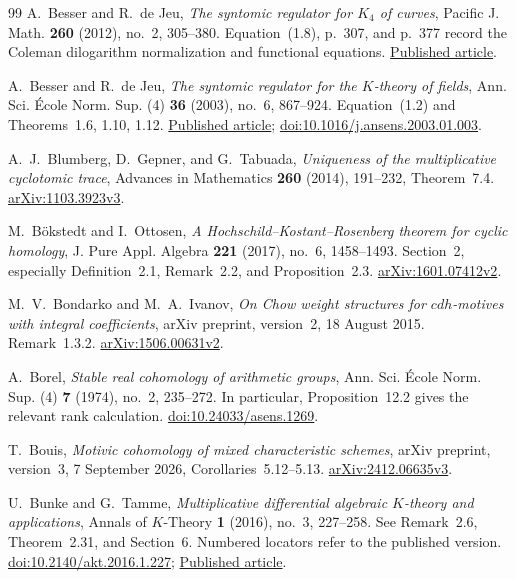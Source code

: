 \documentclass[11pt,a4paper]{amsart}
\numberwithin{equation}{section}
\theoremstyle{definition}
\theoremstyle{remark}
\begin{document}
\begin{thebibliography}{99}
A.~Besser and R.~de Jeu, \emph{The syntomic regulator for $K_4$ of curves}, Pacific J. Math. \textbf{260} (2012), no.~2, 305--380. Equation~(1.8), p.~307, and p.~377 record the Coleman dilogarithm normalization and functional equations.
\href{https://msp.org/pjm/2012/260-2/pjm-v260-n2-p03-s.pdf}{Published article}.

A.~Besser and R.~de Jeu, \emph{The syntomic regulator for the $K$-theory of fields}, Ann. Sci. \'Ecole Norm. Sup. (4) \textbf{36} (2003), no.~6, 867--924. Equation~(1.2) and Theorems~1.6, 1.10, 1.12.
\href{https://www.numdam.org/article/ASENS_2003_4_36_6_867_0.pdf}{Published article};
\href{https://doi.org/10.1016/j.ansens.2003.01.003}{doi:10.1016/j.ansens.2003.01.003}.

A.~J.~Blumberg, D.~Gepner, and G.~Tabuada,
\emph{Uniqueness of the multiplicative cyclotomic trace},
Advances in Mathematics \textbf{260} (2014), 191--232, Theorem~7.4.
\href{https://arxiv.org/abs/1103.3923v3}{arXiv:1103.3923v3}.

M.~B\"okstedt and I.~Ottosen,
\emph{A Hochschild--Kostant--Rosenberg theorem for cyclic homology},
J. Pure Appl. Algebra \textbf{221} (2017), no.~6, 1458--1493.
Section~2, especially Definition~2.1, Remark~2.2, and Proposition~2.3.
\href{https://arxiv.org/abs/1601.07412v2}{arXiv:1601.07412v2}.

M.~V.~Bondarko and M.~A.~Ivanov,
\emph{On Chow weight structures for $cdh$-motives with integral coefficients},
arXiv preprint, version~2, 18 August 2015. Remark~1.3.2.
\href{https://arxiv.org/abs/1506.00631v2}{arXiv:1506.00631v2}.

A.~Borel, \emph{Stable real cohomology of arithmetic groups}, Ann. Sci. \'Ecole Norm. Sup. (4) \textbf{7} (1974), no.~2, 235--272. In particular, Proposition~12.2 gives the relevant rank calculation.
\href{https://doi.org/10.24033/asens.1269}{doi:10.24033/asens.1269}.

T.~Bouis, \emph{Motivic cohomology of mixed characteristic schemes},
arXiv preprint, version~3, 7 September 2026, Corollaries~5.12--5.13.
\href{https://arxiv.org/abs/2412.06635v3}{arXiv:2412.06635v3}.

U.~Bunke and G.~Tamme, \emph{Multiplicative differential algebraic $K$-theory and applications}, Annals of $K$-Theory \textbf{1} (2016), no.~3, 227--258. See Remark~2.6, Theorem~2.31, and Section~6.
Numbered locators refer to the published version.
\href{https://doi.org/10.2140/akt.2016.1.227}{doi:10.2140/akt.2016.1.227};
\href{https://msp.org/akt/2016/1-3/akt-v1-n3-p01-s.pdf}{Published article}.


\end{thebibliography}
\end{document}
